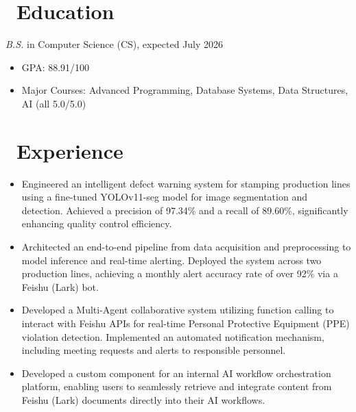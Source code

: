 \documentclass{resume}
\begin{document}



\section{\faGraduationCap\ Education}
\textit{B.S.} in Computer Science (CS), expected July 2026
\begin{itemize}
  \item GPA: 88.91/100
  \item Major Courses: Advanced Programming, Database Systems, Data Structures, AI (all 5.0/5.0)
\end{itemize}

\section{\faUsers\ Experience}

\begin{itemize}
  \item Engineered an intelligent defect warning system for stamping production lines using a fine-tuned YOLOv11-seg model for image segmentation and detection. Achieved a precision of 97.34\% and a recall of 89.60\%, significantly enhancing quality control efficiency.
  \item Architected an end-to-end pipeline from data acquisition and preprocessing to model inference and real-time alerting. Deployed the system across two production lines, achieving a monthly alert accuracy rate of over 92\% via a Feishu (Lark) bot.
  \item Developed a Multi-Agent collaborative system utilizing function calling to interact with Feishu APIs for real-time Personal Protective Equipment (PPE) violation detection. Implemented an automated notification mechanism, including meeting requests and alerts to responsible personnel.
  \item Developed a custom component for an internal AI workflow orchestration platform, enabling users to seamlessly retrieve and integrate content from Feishu (Lark) documents directly into their AI workflows.
\end{itemize}
\end{document}
